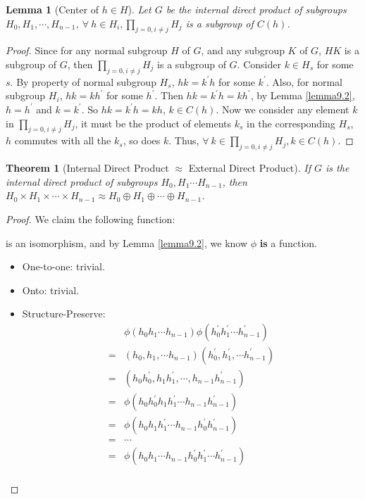 \documentclass[14pt]{extarticle}
\newtheorem{theorem}{Theorem}[section]
\newtheorem{lemma}{Lemma}[section]
\newcommand{\join}[3][,]{#2_0 #1 #2_1 #1 \cdots #1 #2_{#3}}
\begin{document}
\begin{lemma}[Center of $h \in H$]
  Let $G$ be the internal direct product of subgroups $\join{H}{n - 1}$,
  $\forall \ h \in H_i, \prod_{j = 0, i \neq j} H_j$ is a subgroup of $C(h)$.
\end{lemma}
\begin{proof}
  Since for any normal subgroup $H$ of $G$, and any subgroup $K$ of $G$, $HK$ is a subgroup of $G$,
  then $\prod_{j = 0, i \neq j} H_j$ is a subgroup of $G$.
  Consider $k \in H_s$ for some $s$.
  By property of normal subgroup $H_s$, $hk = k^\prime h$ for some $k^\prime$.
  Also, for normal subgroup $H_i$, $hk = kh^\prime$ for some $h^\prime$.
  Then $hk = k^\prime h = k h^\prime$, by Lemma \ref{lemma9.2},
  $h = h^\prime$ and $k = k^\prime$.
  So $hk = k^\prime h = kh$, $k \in C(h)$.
  Now we consider any element $k$ in $\prod_{j = 0, i \neq j} H_j$,
  it must be the product of elements $k_s$ in the corresponding $H_s$,
  $h$ commutes with all the $k_s$, so does $k$.
  Thus, $\forall \ k \in \prod_{j = 0, i \neq j} H_j, k \in C(h)$.
\end{proof}

\begin{theorem}[Internal Direct Product $\approx$ External Direct Product]
  If $G$ is the internal direct product of subgroups $H_0, H_1 \cdots H_{n - 1}$,
  then $H_0 \times H_1 \times \cdots \times H_{n - 1} \approx H_0 \oplus H_1 \oplus \cdots \oplus H_{n - 1}$.
\end{theorem}
\begin{proof}
  We claim the following function:
  \begin{center}
  \end{center}
  is an isomorphism, and 
  by Lemma \ref{lemma9.2}, we know $\phi$ \textbf{is} a function.

  \begin{itemize}
    \item One-to-one: trivial.
    \item Onto: trivial.
    \item Structure-Preserve:
      \begin{align*}
         & \phi(h_0 h_1 \cdots h_{n - 1}) \phi(h_0^\prime h_1^\prime \cdots h_{n - 1}^\prime) \\
        =& (h_0, h_1, \cdots h_{n - 1}) (h_0^\prime, h_1^\prime, \cdots h_{n - 1}^\prime) \\
        =& (h_0h_0^\prime, h_1h_1^\prime, \cdots, h_{n - 1}h_{n - 1}^\prime) \\
        =& \phi(h_0h_0^\prime h_1h_1^\prime \cdots h_{n - 1}h_{n - 1}^\prime) \\
        =& \phi(h_0h_1h_1^\prime\cdots h_{n - 1} h_0^\prime h_{n - 1}^\prime) \\
        =& \cdots \\
        =& \phi(\join[]{h}{n - 1} \join[]{h^\prime}{n - 1}) \\
      \end{align*}
  \end{itemize}
\end{proof}
\end{document}
